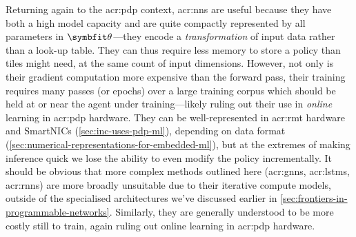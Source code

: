 Returning again to the \gls{acr:pdp} context, \glspl{acr:nn} are useful because they have both a high model capacity and are quite compactly represented by all parameters in $\wvec{}$---they encode a \emph{transformation} of input data rather than a look-up table.
They can thus require less memory to store a policy than tiles might need, at the same count of input dimensions.
However, not only is their gradient computation more expensive than the forward pass, their training requires many passes (or epochs) over a large training corpus which should be held at or near the agent under training---likely ruling out their use in \emph{online} learning in \gls{acr:pdp} hardware.
They can be well-represented in \gls{acr:rmt} hardware and SmartNICs (\cref{sec:inc-uses-pdp-ml}), depending on data format (\cref{sec:numerical-representations-for-embedded-ml}), but at the extremes of making inference quick we lose the ability to even modify the policy incrementally.
It should be obvious that more complex methods outlined here (\glspl{acr:gnn}, \glspl{acr:lstm}, \glspl{acr:rnn}) are more broadly unsuitable due to their iterative compute models, outside of the specialised architectures we've discussed earlier in \cref{sec:frontiers-in-programmable-networks}.
Similarly, they are generally understood to be more costly still to train, again ruling out online learning in \gls{acr:pdp} hardware.



